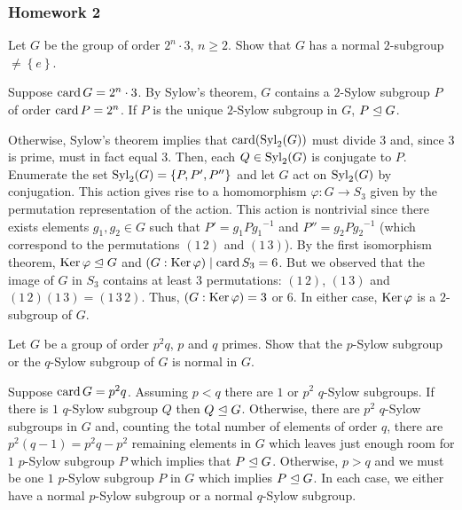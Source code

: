 \subsubsection{Homework 2}
\setcounter{exercise}{0}
\setcounter{equation}{0}

\begin{problem}
  Let \(G\) be the group of order \(2^n\cdot 3\), \(n\geq 2\). Show that
  \(G\) has a normal \(2\)-subgroup \(\neq\left\{e\right\}\).
\end{problem}
\begin{solution}
  Suppose \(\operatorname{card} G=2^n\cdot 3\). By Sylow's theorem, \(G\) contains a
  \(2\)-Sylow subgroup \(P\) of order \(\operatorname{card} P=2^n\). If \(P\) is the
  unique \(2\)-Sylow subgroup in \(G\), \(P\trianglelefteq G\).

  Otherwise, Sylow's theorem implies that \(\operatorname{card}({\operatorname{Syl}_2(G)})\) must
  divide \(3\) and, since \(3\) is prime, must in fact equal \(3\). Then,
  each \(Q\in\operatorname{Syl}_2(G)\) is conjugate to \(P\). Enumerate the set
  \(\operatorname{Syl}_2(G)=\left\{P,P',P''\right\}\) and let \(G\) act on \(\operatorname{Syl}_2(G)\)
  by conjugation. This action gives rise to a homomorphism
  \(\varphi\colon G\to S_3\) given by the permutation representation of the
  action. This action is nontrivial since there exists elements
  \(g_1,g_2\in G\) such that \(P'=g_1P{g_1}^{-1}\) and
  \(P''=g_2P{g_2}^{-1}\) (which correspond to the permutations \((1\,2)\)
  and \((1\,3)\)). By the first isomorphism theorem,
  \(\operatorname{Ker}\varphi\trianglelefteq G\) and \((G:{\operatorname{Ker}\varphi})\mid \operatorname{card} S_3=6\). But
  we observed that the image of \(G\) in \(S_3\) contains at least \(3\)
  permutations: \((1\,2)\), \((1\,3)\) and
  \((1\,2)(1\,3)=(1\,3\,2)\). Thus, \((G:{\operatorname{Ker}\varphi})=3\) or \(6\). In
  either case, \(\operatorname{Ker}\varphi\) is a \(2\)-subgroup of \(G\).
\end{solution}

\begin{problem}
  Let \(G\) be a group of order \(p^2q\), \(p\) and \(q\) primes. Show that
  the \(p\)-Sylow subgroup or the \(q\)-Sylow subgroup of \(G\) is normal
  in \(G\).
\end{problem}
\begin{solution}
  Suppose \(\operatorname{card} G=p^2q\). Assuming \(p<q\) there are \(1\) or \(p^2\)
  \(q\)-Sylow subgroups. If there is \(1\) \(q\)-Sylow subgroup \(Q\) then
  \(Q\trianglelefteq G\). Otherwise, there are \(p^2\) \(q\)-Sylow subgroups in
  \(G\) and, counting the total number of elements of order \(q\), there
  are \(p^2(q-1)=p^2q-p^2\) remaining elements in \(G\) which leaves just
  enough room for \(1\) \(p\)-Sylow subgroup \(P\) which implies that
  \(P\trianglelefteq G\). Otherwise, \(p>q\) and we must be one \(1\) \(p\)-Sylow
  subgroup \(P\) in \(G\) which implies \(P\trianglelefteq G\). In each case, we
  either have a normal \(p\)-Sylow subgroup or a normal \(q\)-Sylow
  subgroup.
\end{solution}

